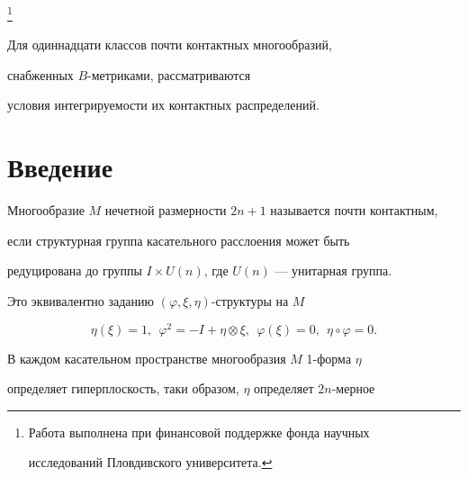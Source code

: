 \thanks{Работа выполнена при финансовой поддержке фонда научных 


исследований Пловдивского уни\-вер\-си\-те\-та.} 


 


\date{} 




\pagestyle{plain} %


 




\maketitle 


\label{begin} 


 


Для одиннадцати классов почти контактных многообразий,


снабженных $B$-метриками, рассматриваются 


условия интегрируемости их контактных распределений.





 


\section{Введение} 





Многообразие $M$ нечетной размерности $2n+1$ называется почти контактным,


если структурная группа касательного расслоения может быть


редуцирована до группы $I\times U(n)$, где $U(n)$ --- унитарная группа.


Это эквивалентно заданию $(\varphi,\xi,\eta)$-структуры на $M$ \cite{3}


$$ 


\eta(\xi)=1,\ \ \varphi^2=-I+\eta\otimes\xi, 


\ \ \varphi(\xi)=0,\ \ \eta\circ\varphi=0. 


$$ 


В каждом касательном пространстве многообразия $M$ 1-форма $\eta$


определяет гиперплоскость, таки образом, $\eta$ определяет $2n$-мерное


